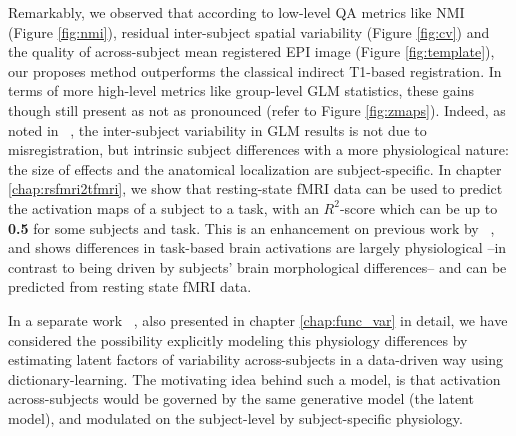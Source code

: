 Remarkably, we observed that according to low-level QA metrics
like NMI (Figure \ref{fig:nmi}), residual inter-subject spatial
variability (Figure \ref{fig:cv}) and the  quality of across-subject mean
registered EPI image (Figure \ref{fig:template}), our proposes method
outperforms the classical indirect T1-based registration.
%
In terms of more high-level metrics like group-level GLM statistics, these gains though still present as not as pronounced (refer to Figure \ref{fig:zmaps}). Indeed, as noted in
~\citep{thirion2007analysis,pmid22425669,Xu2009}, the inter-subject variability
in GLM results is not due to misregistration, but intrinsic subject
differences with a more physiological nature: the size of effects and
the anatomical localization are subject-specific. In chapter \ref{chap:rsfmri2tfmri},
we show that resting-state fMRI data can be used to predict the activation maps of
a subject to a task, with an $R^2$-score which can be up to \textbf{0.5} for some subjects and task.
This is an enhancement on previous work by ~\citep{tavor2016task}, and shows
differences in task-based brain activations are largely physiological --in contrast to being driven
by subjects' brain morphological differences-- and can be predicted from resting state fMRI data.

In a separate work ~\citep{dohmatob2016}, also presented in chapter \ref{chap:func_var} in detail, we have considered the possibility explicitly
modeling this physiology differences by estimating latent
factors of variability across-subjects in a data-driven way using
dictionary-learning. The motivating idea behind such a model, is that activation
across-subjects would be governed by the same generative model (the latent model),
and modulated on the subject-level by
subject-specific physiology. 


